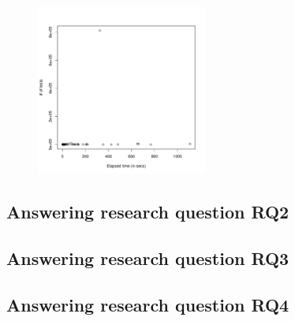
\begin{figure}[t!]
    \centering
    \includegraphics[width=0.5\textwidth]{plots/teststime-scatter/timetests-scatter.pdf}
    \caption{\label{fig:timetests-scatter} }
\end{figure}

\subsection{Answering research question RQ2}
\label{sec:rqtwo}



\subsection{Answering research question RQ3}
\label{sec:rqthree}



\subsection{Answering research question RQ4}
\label{sec:rqfour}



